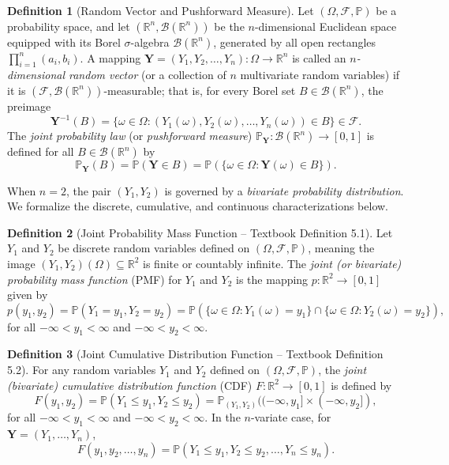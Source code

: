 \documentclass[11pt, letterpaper]{article}
\theoremstyle{definition}
\newtheorem{definition}{Definition}[section]
\theoremstyle{remark}
\begin{document}
\begin{definition}[Random Vector and Pushforward Measure]
Let $(\Omega, \mathcal{F}, \mathbb{P})$ be a probability space, and let $(\mathbb{R}^n, \mathcal{B}(\mathbb{R}^n))$ be the $n$-dimensional Euclidean space equipped with its Borel $\sigma$-algebra $\mathcal{B}(\mathbb{R}^n)$, generated by all open rectangles $\prod_{i=1}^n (a_i, b_i)$. A mapping $\mathbf{Y} = (Y_1, Y_2, \dots, Y_n) : \Omega \to \mathbb{R}^n$ is called an \emph{$n$-dimensional random vector} (or a collection of $n$ multivariate random variables) if it is $(\mathcal{F}, \mathcal{B}(\mathbb{R}^n))$-measurable; that is, for every Borel set $B \in \mathcal{B}(\mathbb{R}^n)$, the preimage
\[
    \mathbf{Y}^{-1}(B) = \{\omega \in \Omega : (Y_1(\omega), Y_2(\omega), \dots, Y_n(\omega)) \in B\} \in \mathcal{F}.
\]
The \emph{joint probability law} (or \emph{pushforward measure}) $\mathbb{P}_{\mathbf{Y}} : \mathcal{B}(\mathbb{R}^n) \to [0, 1]$ is defined for all $B \in \mathcal{B}(\mathbb{R}^n)$ by
\[
    \mathbb{P}_{\mathbf{Y}}(B) = \mathbb{P}(\mathbf{Y} \in B) = \mathbb{P}(\{\omega \in \Omega : \mathbf{Y}(\omega) \in B\}).
\]
\end{definition}

When $n = 2$, the pair $(Y_1, Y_2)$ is governed by a \emph{bivariate probability distribution}. We formalize the discrete, cumulative, and continuous characterizations below.

\begin{definition}[Joint Probability Mass Function -- Textbook Definition 5.1]
Let $Y_1$ and $Y_2$ be discrete random variables defined on $(\Omega, \mathcal{F}, \mathbb{P})$, meaning the image $(Y_1, Y_2)(\Omega) \subseteq \mathbb{R}^2$ is finite or countably infinite. The \emph{joint (or bivariate) probability mass function} (PMF) for $Y_1$ and $Y_2$ is the mapping $p : \mathbb{R}^2 \to [0, 1]$ given by
\[
    p(y_1, y_2) = \mathbb{P}(Y_1 = y_1, Y_2 = y_2) = \mathbb{P}(\{\omega \in \Omega : Y_1(\omega) = y_1\} \cap \{\omega \in \Omega : Y_2(\omega) = y_2\}),
\]
for all $-\infty < y_1 < \infty$ and $-\infty < y_2 < \infty$.
\end{definition}

\begin{definition}[Joint Cumulative Distribution Function -- Textbook Definition 5.2]
For any random variables $Y_1$ and $Y_2$ defined on $(\Omega, \mathcal{F}, \mathbb{P})$, the \emph{joint (bivariate) cumulative distribution function} (CDF) $F : \mathbb{R}^2 \to [0, 1]$ is defined by
\[
    F(y_1, y_2) = \mathbb{P}(Y_1 \le y_1, Y_2 \le y_2) = \mathbb{P}_{(Y_1, Y_2)}((-\infty, y_1] \times (-\infty, y_2]),
\]
for all $-\infty < y_1 < \infty$ and $-\infty < y_2 < \infty$. In the $n$-variate case, for $\mathbf{Y} = (Y_1, \dots, Y_n)$,
\[
    F(y_1, y_2, \dots, y_n) = \mathbb{P}(Y_1 \le y_1, Y_2 \le y_2, \dots, Y_n \le y_n).
\]
\end{definition}
\end{document}
